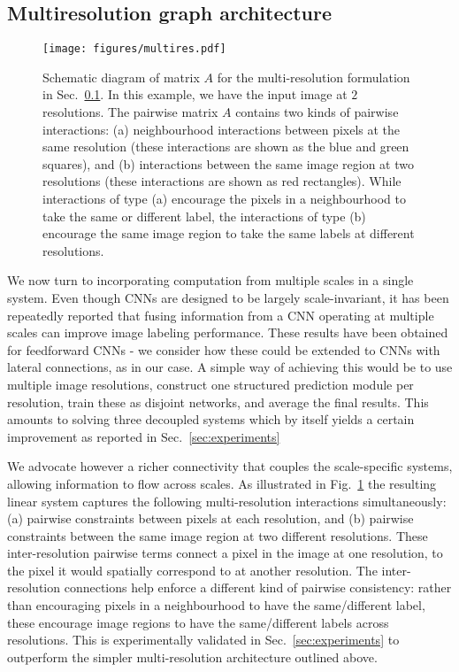 \documentclass[runningheads]{llncs}
\newcommand{\reffig}[1]{Fig.~\ref{#1}}
\newcommand{\refsec}[1]{Sec.~{\ref{#1}}}
\begin{document}
\subsection{Multiresolution graph architecture}
\label{sec:multires}
\begin{figure}
		\centering
		\texttt{[image: figures/multires.pdf]}
		\caption{Schematic diagram of matrix $A$ for the multi-resolution formulation in \refsec{sec:multires}. In this example, we have the input image at $2$ resolutions. 
		The pairwise matrix $A$ contains two kinds of pairwise interactions: (a) neighbourhood interactions between pixels at the same resolution (these interactions are shown as the blue and green squares), 
		and (b) interactions between the same image region at two resolutions (these interactions are shown as red rectangles). While interactions of type (a) encourage the pixels in a neighbourhood to take
		the same or different label, the interactions of type (b) encourage the same image region to take the same labels at different resolutions.
		}
		\label{fig:plot_solversb}
\end{figure}

We now turn to incorporating computation from multiple scales in a single system. Even though CNNs are designed to be largely scale-invariant, it has been repeatedly reported \cite{ChenYWXY15,edg} that fusing information from a CNN operating at multiple scales can improve image labeling performance.
These results have been obtained for feedforward CNNs - we consider how these could be extended to CNNs with lateral connections, as in our case. 
A simple way of achieving this would be to use multiple image resolutions, construct one structured prediction module per resolution, train these as disjoint networks, and average the final results. 
This  amounts to solving three decoupled systems which by itself yields a certain improvement as reported in \refsec{sec:experiments} 

We advocate however  a richer connectivity that couples the scale-specific systems, allowing information to flow across scales. As illustrated in \reffig{fig:plot_solversb} the resulting linear system captures the following multi-resolution interactions simultaneously: (a) pairwise constraints between pixels at each resolution, and (b) pairwise
constraints between the same image region at two different resolutions. These inter-resolution pairwise terms connect a pixel in the image at one resolution, to the pixel it would spatially correspond to at another resolution. The inter-resolution connections
help enforce a different kind of pairwise consistency: rather than encouraging pixels in a neighbourhood to have the same/different label, these encourage image regions to have the same/different labels across resolutions. This is experimentally validated in \refsec{sec:experiments} to outperform the simpler multi-resolution architecture outlined above. 
\end{document}
